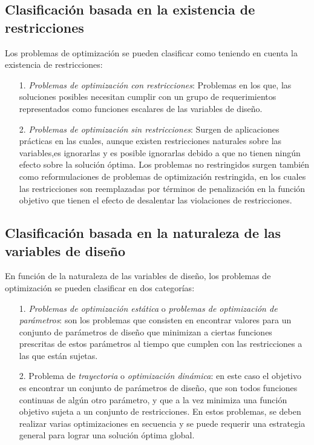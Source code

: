 \subsection{Clasificación basada en la existencia de restricciones}
Los problemas de optimización se pueden clasificar como teniendo en cuenta la existencia de restricciones:
\begin{itemize}
\item [1.]  \textit{Problemas de optimización con restricciones}: Problemas en los que, las soluciones posibles necesitan cumplir con un grupo de requerimientos representados como funciones escalares de las variables de diseño.
\item [2.]  \textit{Problemas de optimización sin restricciones}: Surgen de aplicaciones prácticas en las cuales, aunque existen restricciones naturales sobre las variables,es ignorarlas y es posible ignorarlas debido a que no tienen ningún efecto sobre la solución óptima. Los problemas no restringidos surgen también como reformulaciones de problemas de optimización restringida, en los cuales las restricciones son reemplazadas por términos de penalización en la función objetivo que tienen el efecto de desalentar las violaciones de restricciones.
\end{itemize}

\subsection{Clasificación basada en la naturaleza de las variables de diseño} 
En función de la naturaleza de las variables de diseño, los problemas de optimización se pueden clasificar en dos categorías:
\begin{itemize}
\item[1.]  \textit{Problemas de optimización estática} o \textit{problemas de optimización de parámetros}: son los problemas que consisten en encontrar valores para un conjunto de parámetros de diseño que minimizan a ciertas funciones prescritas de estos parámetros al tiempo que cumplen con las restricciones a las que están sujetas. 
\item[2.] Problema de \textit{trayectoria} o \textit{optimización dinámica}: en este caso el objetivo es encontrar un conjunto de parámetros de diseño, que son todos funciones continuas de algún otro parámetro, y que a la vez minimiza una función objetivo sujeta a un conjunto de restricciones. En estos problemas, se deben realizar varias optimizaciones en secuencia y se puede requerir una estrategia general para lograr una solución óptima global.
\end{itemize}
